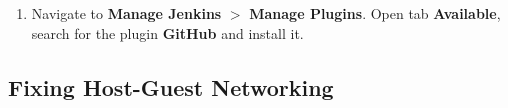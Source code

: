 \documentclass[11pt,a4paper]{article}
\begin{document}
\begin{enumerate}
\item Navigate to {\bf Manage Jenkins} $>$ {\bf Manage Plugins}. 
Open tab {\bf Available}, search for the plugin {\bf GitHub} and install it.\\
\end{enumerate}



\subsection{Fixing Host-Guest Networking}
\end{document}
